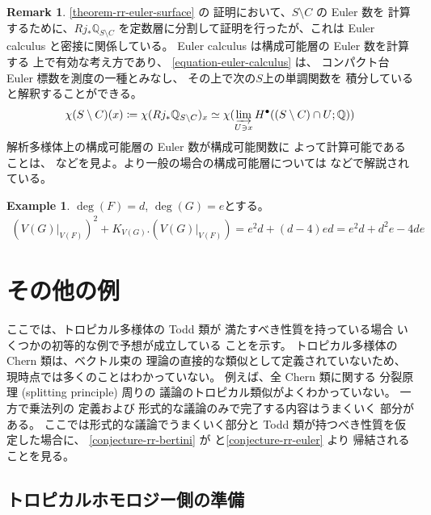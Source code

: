 \documentclass[a4paper,dvipdfmx,reqno,12pt]{amsart}
\theoremstyle{definition}
\newtheorem{example}[theorem]{Example}
\newtheorem{remark}[theorem]{Remark}
\newcommand{\deq}{\coloneqq}
\newcommand{\opn}[1]{\operatorname{#1}}
\numberwithin{equation}{section}
\begin{document}
\begin{remark}
\cref{theorem-rr-euler-surface} の
証明において、$S\setminus C$ の Euler 数を
計算するために、$Rj_*\mathbb{Q}_{S\setminus C}$
を定数層に分割して証明を行ったが、これは
Euler calculus と密接に関係している\cite{MR970076,MR1115569}。
Euler calculus は構成可能層の Euler 数を計算する
上で有効な考え方であり、
\cref{equation-euler-calculus} は、
コンパクト台 Euler 標数を測度の一種とみなし、
その上で次の$S$上の単調関数を
積分していると解釈することができる。
\begin{align}
\chi(S\setminus C)(x)\deq \chi(Rj_*\mathbb{Q}_{S\setminus C})_x 
\simeq \chi(\varinjlim_{U\ni x} H^{\bullet}((S\setminus C)
\cap U;\mathbb{Q}))   
\end{align}
解析多様体上の構成可能層の Euler 数が構成可能関数に
よって計算可能であることは、\cite[Theorem 9.7.1]{MR1299726}
などを見よ。より一般の場合の構成可能層については
\cite[Chapter 2]{MR2031639} などで解説されている。
\end{remark}

\begin{example}
$\opn{deg}(F)=d$, $\opn{deg}(G)=e$とする。
\begin{align}
(V(G)|_{V(F)})^{2}+K_{V(G)}.(V(G)|_{V(F)})
=e^2d+(d-4)ed=e^2d+d^2e-4de
\end{align}

\end{example}

\section{その他の例}

ここでは、トロピカル多様体の Todd 類が
満たすべき性質を持っている場合
いくつかの初等的な例で予想が成立している
ことを示す。
トロピカル多様体の Chern 類は、ベクトル束の
理論の直接的な類似として定義されていないため、
現時点では多くのことはわかっていない。
例えば、全 Chern 類に関する
分裂原理 (splitting principle) 周りの
議論のトロピカル類似がよくわかっていない。
一方で乗法列\cite[]{MR1335917}の
定義および
形式的な議論のみで完了する内容はうまくいく
部分がある。
ここでは形式的な議論でうまくいく部分と
Todd 類が持つべき性質を仮定した場合に、
\cref{conjecture-rr-bertini} 
が\cite[Conjecture 6.13]{demedrano2023chern}
と\cref{conjecture-rr-euler} より
帰結されることを見る。



\subsection{トロピカルホモロジー側の準備}
\end{document}
